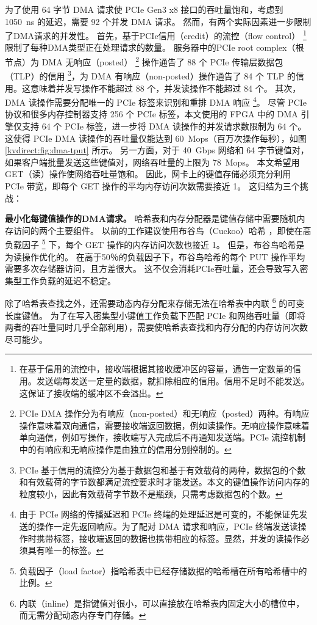 为了使用 64 字节 DMA 请求使 PCIe Gen3 x8 接口的吞吐量饱和，考虑到 1050~ns 的延迟，需要 92 个并发 DMA 请求。
然而，有两个实际因素进一步限制了DMA请求的并发性。
首先，基于PCIe信用（credit）的流控（flow control） \footnote{在基于信用的流控中，接收端根据其接收缓冲区的容量，通告一定数量的信用。发送端每发送一定量的数据，就扣除相应的信用。信用不足时不能发送。这保证了接收端的缓冲区不会溢出。} 限制了每种DMA类型正在处理请求的数量。
服务器中的PCIe root complex（根节点）为 DMA 无响应（posted） \footnote{PCIe DMA 操作分为有响应（non-posted）和无响应（posted）两种。有响应操作意味着双向通信，需要接收端返回数据，例如读操作。无响应操作意味着单向通信，例如写操作，接收端写入完成后不再通知发送端。PCIe 流控机制中的有响应和无响应操作是由独立的信用分别控制的。} 操作通告了 88 个 PCIe 传输层数据包（TLP）的信用 \footnote{PCIe 基于信用的流控分为基于数据包和基于有效载荷的两种，数据包的个数和有效载荷的字节数都满足流控要求时才能发送。本文的键值操作访问内存的粒度较小，因此有效载荷字节数不是瓶颈，只需考虑数据包的个数。}，为 DMA 有响应（non-posted）操作通告了 84 个 TLP 的信用。这意味着并发写操作不能超过 88 个，并发读操作不能超过 84 个。
其次，DMA 读操作需要分配唯一的 PCIe 标签来识别和重排 DMA 响应 \footnote{由于 PCIe 网络的传播延迟和 PCIe 终端的处理延迟是可变的，不能保证先发送的操作一定先返回响应。为了配对 DMA 请求和响应，PCIe 终端发送读操作时携带标签，接收端返回的数据也携带相应的标签。显然，并发的读操作必须具有唯一的标签。}。
尽管 PCIe 协议和很多内存控制器支持 256 个 PCIe 标签，本文使用的 FPGA 中的 DMA 引擎仅支持 64 个 PCIe 标签，进一步将 DMA 读操作的并发请求数限制为 64 个。这使得 PCIe DMA 读操作的吞吐量仅能达到 60~Mops（百万次操作每秒），如图 \ref {kvdirect:fig:dma-tput} 所示。
另一方面，对于 40~Gbps 网络和 64 字节键值对，如果客户端批量发送这些键值对，网络吞吐量的上限为 78~Mops。
本文希望用 GET（读）操作使网络吞吐量饱和。
因此，网卡上的键值存储必须充分利用 PCIe 带宽，即每个 GET 操作的平均内存访问次数需要接近 1。
这归结为三个挑战：

\textbf {最小化每键值操作的DMA请求。}
哈希表和内存分配器是键值存储中需要随机内存访问的两个主要组件。
以前的工作建议使用布谷鸟（Cuckoo）哈希 \cite {dragojevic2014farm,breslow2016horton}，即使在高负载因子 \footnote{负载因子（load factor）指哈希表中已经存储数据的哈希槽在所有哈希槽中的比例。} 下，每个 GET 操作的内存访问次数也接近 1。
但是，布谷鸟哈希是为读操作优化的。
在高于50％的负载因子下，布谷鸟哈希的每个 PUT 操作平均需要多次存储器访问，且方差很大。
这不仅会消耗PCIe吞吐量，还会导致写入密集型工作负载的延迟不稳定。

除了哈希表查找之外，还需要动态内存分配来存储无法在哈希表中内联 \footnote{内联（inline）是指键值对很小，可以直接放在哈希表内固定大小的槽位中，而无需分配动态内存专门存储。} 的可变长度键值。
为了在写入密集型小键值工作负载下匹配 PCIe 和网络吞吐量（即将两者的吞吐量同时几乎全部利用），需要使哈希表查找和内存分配的内存访问次数尽可能少。

